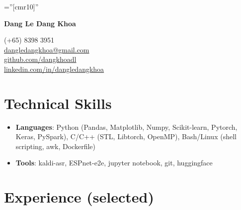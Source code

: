 \documentclass[10pt]{article}
\begin{document}
    \pagestyle{empty}       %
    \font\fb=''[cmr10]''    %

    \begin{multicols}{2}
        \begin{flushleft}
            \textbf{{\Huge Dang Le Dang Khoa }}
        \end{flushleft}

        \columnbreak

        \begin{flushright}
            \normalsize (+65) 8398 3951 \\
            \href{mailto:dangledangkhoa@gmail.com}{dangledangkhoa@gmail.com} \\
            \href{https://github.com/dangkhoadl}{github.com/dangkhoadl} \\
            \href{https://sg.linkedin.com/in/dangledangkhoa}{linkedin.com/in/dangledangkhoa}
        \end{flushright}
    \end{multicols}

    \vspace{-8mm}
    \section{Technical Skills}
    \begin{itemize}[noitemsep,leftmargin=*]
        \item \textbf{Languages}: Python (Pandas, Matplotlib, Numpy, Scikit-learn, Pytorch, Keras, PySpark), C/C++ (STL, Libtorch, OpenMP), Bash/Linux (shell scripting, awk, Dockerfile)
        \item \textbf{Tools}: kaldi-asr, ESPnet-e2e, jupyter notebook, git, huggingface
    \end{itemize}

    \vspace{2mm}
    \section{Experience (selected)}
        \vspace{-2mm}
\end{document}
